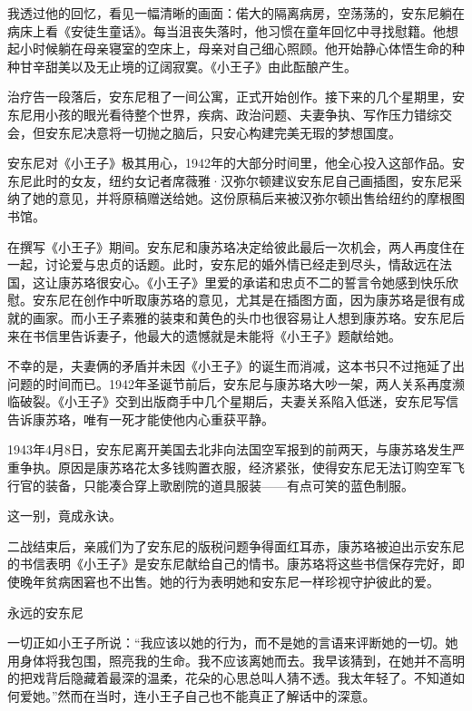 我透过他的回忆，看见一幅清晰的画面：偌大的隔离病房，空荡荡的，安东尼躺在病床上看《安徒生童话》。每当沮丧失落时，他习惯在童年回忆中寻找慰籍。他想起小时候躺在母亲寝室的空床上，母亲对自己细心照顾。他开始静心体悟生命的种种甘辛甜美以及无止境的辽阔寂寞。《小王子》由此酝酿产生。

治疗告一段落后，安东尼租了一间公寓，正式开始创作。接下来的几个星期里，安东尼用小孩的眼光看待整个世界，疾病、政治问题、夫妻争执、写作压力错综交会，但安东尼决意将一切抛之脑后，只安心构建完美无瑕的梦想国度。

安东尼对《小王子》极其用心，1942年的大部分时间里，他全心投入这部作品。安东尼此时的女友，纽约女记者席薇雅·汉弥尔顿建议安东尼自己画插图，安东尼采纳了她的意见，并将原稿赠送给她。这份原稿后来被汉弥尔顿出售给纽约的摩根图书馆。

在撰写《小王子》期间。安东尼和康苏珞决定给彼此最后一次机会，两人再度住在一起，讨论爱与忠贞的话题。此时，安东尼的婚外情已经走到尽头，情敌远在法国，这让康苏珞很安心。《小王子》里爱的承诺和忠贞不二的誓言令她感到快乐欣慰。安东尼在创作中听取康苏珞的意见，尤其是在插图方面，因为康苏珞是很有成就的画家。而小王子素雅的装束和黄色的头巾也很容易让人想到康苏珞。安东尼后来在书信里告诉妻子，他最大的遗憾就是未能将《小王子》题献给她。

不幸的是，夫妻俩的矛盾并未因《小王子》的诞生而消减，这本书只不过拖延了出问题的时间而已。1942年圣诞节前后，安东尼与康苏珞大吵一架，两人关系再度濒临破裂。《小王子》交到出版商手中几个星期后，夫妻关系陷入低迷，安东尼写信告诉康苏珞，唯有一死才能使他内心重获平静。

1943年4月8日，安东尼离开美国去北非向法国空军报到的前两天，与康苏珞发生严重争执。原因是康苏珞花太多钱购置衣服，经济紧张，使得安东尼无法订购空军飞行官的装备，只能凑合穿上歌剧院的道具服装------有点可笑的蓝色制服。

这一别，竟成永诀。

二战结束后，亲戚们为了安东尼的版税问题争得面红耳赤，康苏珞被迫出示安东尼的书信表明《小王子》是安东尼献给自己的情书。康苏珞将这些书信保存完好，即使晚年贫病困窘也不出售。她的行为表明她和安东尼一样珍视守护彼此的爱。

{\startalignment[center]
 \stopalignment}
永远的安东尼

一切正如小王子所说：“我应该以她的行为，而不是她的言语来评断她的一切。她用身体将我包围，照亮我的生命。我不应该离她而去。我早该猜到，在她并不高明的把戏背后隐藏着最深的温柔，花朵的心思总叫人猜不透。我太年轻了。不知道如何爱她。”然而在当时，连小王子自己也不能真正了解话中的深意。

